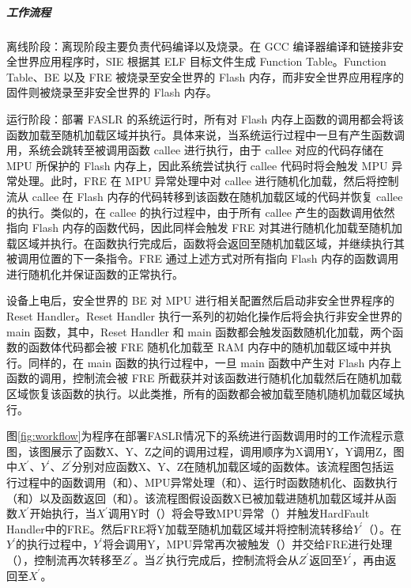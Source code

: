 \documentclass[UTF8,12pt,a4paper,twoside]{ctexart}
\numberwithin{figure}{section}
\begin{document}
\subparagraph{工作流程}
\par 离线阶段：离现阶段主要负责代码编译以及烧录。在 GCC 编译器编译和链接非安全世界应用程序时，SIE 根据其 ELF 目标文件生成 Function Table。Function Table、BE 以及 FRE 被烧录至安全世界的 Flash 内存，而非安全世界应用程序的固件则被烧录至非安全世界的 Flash 内存。
\par 运行阶段：部署 FASLR 的系统运行时，所有对 Flash 内存上函数的调用都会将该函数加载至随机加载区域并执行。具体来说，当系统运行过程中一旦有产生函数调用，系统会跳转至被调用函数 callee 进行执行，由于 callee 对应的代码存储在 MPU 所保护的 Flash 内存上，因此系统尝试执行 callee 代码时将会触发 MPU 异常处理。此时，FRE 在 MPU 异常处理中对 callee 进行随机化加载，然后将控制流从 callee 在 Flash 内存的代码转移到该函数在随机加载区域的代码并恢复 callee 的执行。类似的，在 callee 的执行过程中，由于所有 callee 产生的函数调用依然指向 Flash 内存的函数代码，因此同样会触发 FRE 对其进行随机化加载至随机加载区域并执行。在函数执行完成后，函数将会返回至随机加载区域，并继续执行其被调用位置的下一条指令。FRE 通过上述方式对所有指向 Flash 内存的函数调用进行随机化并保证函数的正常执行。
\par 设备上电后，安全世界的 BE 对 MPU 进行相关配置然后启动非安全世界程序的 Reset Handler。Reset Handler 执行一系列的初始化操作后将会执行非安全世界的 main 函数，其中，Reset Handler 和 main 函数都会触发函数随机化加载，两个函数的函数体代码都会被 FRE 随机化加载至 RAM 内存中的随机加载区域中并执行。同样的，在 main 函数的执行过程中，一旦 main 函数中产生对 Flash 内存上函数的调用，控制流会被 FRE 所截获并对该函数进行随机化加载然后在随机加载区域恢复该函数的执行。以此类推，所有的函数都会被加载至随机随机加载区域执行。
\par 图\ref{fig:workflow}为程序在部署FASLR情况下的系统进行函数调用时的工作流程示意图，该图展示了函数X、Y、Z之间的调用过程，调用顺序为X调用Y，Y调用Z，图中$X^{'}、Y^{'}、Z^{'}$分别对应函数X、Y、Z在随机加载区域的函数体。该流程图包括运行过程中的函数调用（和）、MPU异常处理（和）、运行时函数随机化、函数执行（和）以及函数返回（和）。该流程图假设函数X已被加载进随机加载区域并从函数$X^{'}$开始执行，当$X^{'}$调用Y时（）将会导致MPU异常（）并触发HardFault Handler中的FRE。然后FRE将Y加载至随机加载区域并将控制流转移给$Y^{'}$（）。在$Y^{'}$的执行过程中，$Y^{'}$将会调用Y，MPU异常再次被触发（）并交给FRE进行处理（），控制流再次转移至$Z^{'}$。当$Z^{'}$执行完成后，控制流将会从$Z^{'}$返回至$Y^{'}$，再由返回至$X^{'}$。
\end{document}
